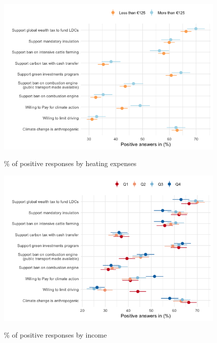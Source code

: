 \begin{framefont}{\small}
\begin{frame}{}%
\begin{figure}[h!]
\caption{\% of positive responses by heating expenses}
\includegraphics[width=.7\paperwidth]{../figures/FR/positive_all_by_heating_expenses_FR.png} \\
\end{figure}
\end{frame}

\begin{frame}{}%
\begin{figure}[h!]
\caption{\% of positive responses by income}
\includegraphics[width=.7\paperwidth]{../figures/FR/positive_all_by_income_FR.png} \\
\end{figure}
\end{frame}


\end{framefont}
